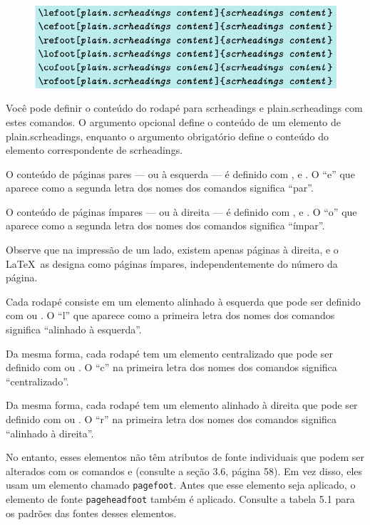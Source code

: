 \begin{figure}
    \centering
    \includegraphics[width=0.8\linewidth]{imagem26.png}
\end{figure}

Você pode definir o conteúdo do rodapé para scrheadings e plain.scrheadings com estes comandos. O argumento opcional define o conteúdo de um elemento de plain.scrheadings, enquanto o argumento obrigatório define o conteúdo do elemento correspondente de scrheadings.

O conteúdo de páginas pares --- ou à esquerda --- é definido com ,  e . O “e” que aparece como a segunda letra dos nomes dos comandos significa “par”.

O conteúdo de páginas ímpares --- ou à direita --- é definido com ,  e . O “o” que aparece como a segunda letra dos nomes dos comandos significa “ímpar”.

Observe que na impressão de um lado, existem apenas páginas à direita, e o \LaTeX\ as designa como páginas ímpares, independentemente do número da página.

Cada rodapé consiste em um elemento alinhado à esquerda que pode ser definido com  ou . O “l” que aparece como a primeira letra dos nomes dos comandos significa “alinhado à esquerda”.

Da mesma forma, cada rodapé tem um elemento centralizado que pode ser definido com  ou . O “c” na primeira letra dos nomes dos comandos significa “centralizado”.

Da mesma forma, cada rodapé tem um elemento alinhado à direita que pode ser definido com  ou . O “r” na primeira letra dos nomes dos comandos significa “alinhado à direita”.

No entanto, esses elementos não têm atributos de fonte individuais que podem ser alterados com os comandos  e  (consulte a seção 3.6, página 58). Em vez disso, eles usam um elemento chamado \texttt{pa\-ge\-foot}. Antes que esse elemento seja aplicado, o elemento de fonte \texttt{pa\-ge\-head\-foot} também é aplicado. Consulte a tabela 5.1 para os padrões das fontes desses elementos.

